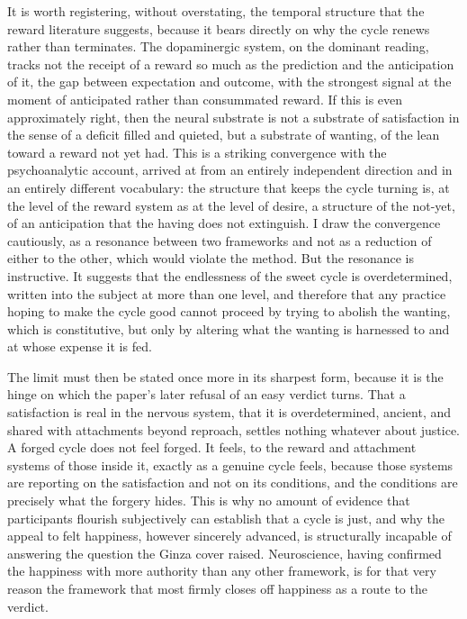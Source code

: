 It is worth registering, without overstating, the temporal structure that the reward literature suggests, because it bears directly on why the cycle renews rather than terminates. The dopaminergic system, on the dominant reading, tracks not the receipt of a reward so much as the prediction and the anticipation of it, the gap between expectation and outcome, with the strongest signal at the moment of anticipated rather than consummated reward. If this is even approximately right, then the neural substrate is not a substrate of satisfaction in the sense of a deficit filled and quieted, but a substrate of wanting, of the lean toward a reward not yet had. This is a striking convergence with the psychoanalytic account, arrived at from an entirely independent direction and in an entirely different vocabulary: the structure that keeps the cycle turning is, at the level of the reward system as at the level of desire, a structure of the not-yet, of an anticipation that the having does not extinguish. I draw the convergence cautiously, as a resonance between two frameworks and not as a reduction of either to the other, which would violate the method. But the resonance is instructive. It suggests that the endlessness of the sweet cycle is overdetermined, written into the subject at more than one level, and therefore that any practice hoping to make the cycle good cannot proceed by trying to abolish the wanting, which is constitutive, but only by altering what the wanting is harnessed to and at whose expense it is fed.

The limit must then be stated once more in its sharpest form, because it is the hinge on which the paper's later refusal of an easy verdict turns. That a satisfaction is real in the nervous system, that it is overdetermined, ancient, and shared with attachments beyond reproach, settles nothing whatever about justice. A forged cycle does not feel forged. It feels, to the reward and attachment systems of those inside it, exactly as a genuine cycle feels, because those systems are reporting on the satisfaction and not on its conditions, and the conditions are precisely what the forgery hides. This is why no amount of evidence that participants flourish subjectively can establish that a cycle is just, and why the appeal to felt happiness, however sincerely advanced, is structurally incapable of answering the question the Ginza cover raised. Neuroscience, having confirmed the happiness with more authority than any other framework, is for that very reason the framework that most firmly closes off happiness as a route to the verdict.

